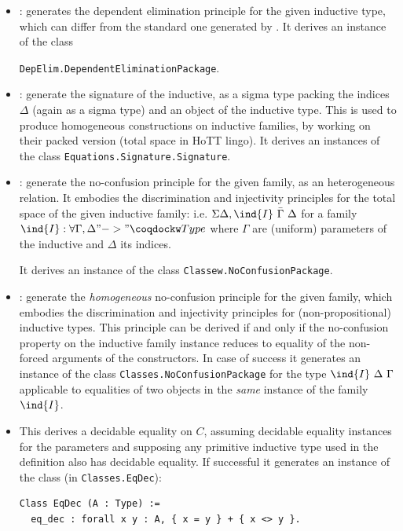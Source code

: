 \begin{itemize}
\item {}: generates the dependent
  elimination principle for the given inductive type, which can differ
  from the standard one generated by \Coq.
  It derives an instance of the class

  \texttt{DepElim.DependentEliminationPackage}.
\item {}: generate the signature of the inductive, as a
  sigma type packing the indices $\Delta$ (again as a sigma type) and
  an object of the inductive type. This is used to produce homogeneous
  constructions on inductive families, by working on their packed
  version (total space in HoTT lingo).
  It derives an instances of the class
  \texttt{Equations.Signature.Signature}.

\item {}: generate the no-confusion principle for the
  given family, as an heterogeneous relation. It embodies the
  discrimination and injectivity principles for the
  total space of the given inductive family: i.e.
  $\Sigma \Delta, \ind{I}~\bar{\Gamma}~\Delta$ for a family
  $\ind{I} : \forall \Gamma, \Delta "->" \kw{Type}$ where $\Gamma$ are
  (uniform) parameters of the inductive and $\Delta$ its indices.

  It derives an instance of the class \texttt{Classew.NoConfusionPackage}.

\item {}: generate the \emph{homogeneous} no-confusion
  principle for the given family, which embodies the discrimination and
  injectivity principles for (non-propositional) inductive types.
  This principle can be derived if and only if the no-confusion property
  on the inductive family instance reduces to equality of the non-forced
  arguments of the constructors. In case of success it generates an instance of the class
  \texttt{Classes.NoConfusionPackage} for the type $\ind{I}~
  \Delta~\Gamma$ applicable to equalities of two objects in the \emph{same}
  instance of the family $\ind{I}$.

\item {}
  This derives a decidable equality on $C$, assuming decidable equality 
  instances for the parameters and supposing any primitive inductive
  type used in the definition also has decidable equality. If
  successful it generates an instance of the class (in \texttt{Classes.EqDec}):
\begin{verbatim}
Class EqDec (A : Type) :=
  eq_dec : forall x y : A, { x = y } + { x <> y }.
\end{verbatim}
  

\end{itemize}
